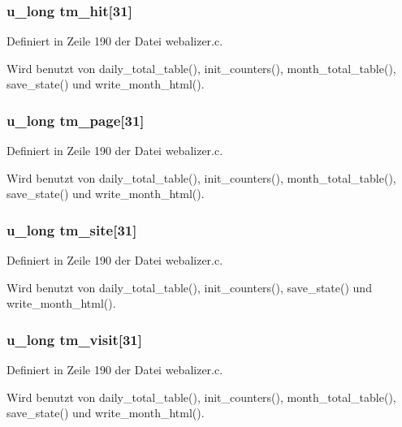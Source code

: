 \subsubsection{\setlength{\rightskip}{0pt plus 5cm}u\_\-long {\bf tm\_\-hit}[31]}\label{webalizer_8c_90b2c6f5c71d87e07a6aa0694651c7a8}




Definiert in Zeile 190 der Datei webalizer.c.

Wird benutzt von daily\_\-total\_\-table(), init\_\-counters(), month\_\-total\_\-table(), save\_\-state() und write\_\-month\_\-html().
\subsubsection{\setlength{\rightskip}{0pt plus 5cm}u\_\-long {\bf tm\_\-page}[31]}\label{webalizer_8c_2b0163914dcd84396a9d6dae48ee4a54}




Definiert in Zeile 190 der Datei webalizer.c.

Wird benutzt von daily\_\-total\_\-table(), init\_\-counters(), month\_\-total\_\-table(), save\_\-state() und write\_\-month\_\-html().
\subsubsection{\setlength{\rightskip}{0pt plus 5cm}u\_\-long {\bf tm\_\-site}[31]}\label{webalizer_8c_3016395581c35bac86027a654deb0db5}




Definiert in Zeile 190 der Datei webalizer.c.

Wird benutzt von daily\_\-total\_\-table(), init\_\-counters(), save\_\-state() und write\_\-month\_\-html().
\subsubsection{\setlength{\rightskip}{0pt plus 5cm}u\_\-long {\bf tm\_\-visit}[31]}\label{webalizer_8c_f3d33c8d579ff7b3d41abb0e618f70a5}




Definiert in Zeile 190 der Datei webalizer.c.

Wird benutzt von daily\_\-total\_\-table(), init\_\-counters(), month\_\-total\_\-table(), save\_\-state() und write\_\-month\_\-html().
